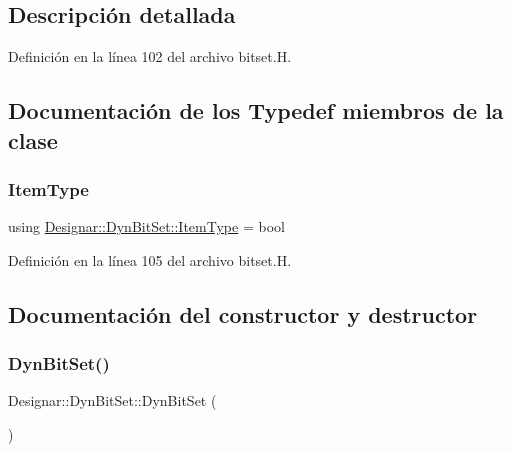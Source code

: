 \subsection{Descripción detallada}


Definición en la línea 102 del archivo bitset.\+H.



\subsection{Documentación de los \textquotesingle{}Typedef\textquotesingle{} miembros de la clase}
\mbox{\label{class_designar_1_1_dyn_bit_set_ad3f66987966a4fc27fec6d6ab552a1c7}} 
\subsubsection{\texorpdfstring{Item\+Type}{ItemType}}
{\footnotesize\ttfamily using \hyperlink{class_designar_1_1_dyn_bit_set_ad3f66987966a4fc27fec6d6ab552a1c7}{Designar\+::\+Dyn\+Bit\+Set\+::\+Item\+Type} =  bool}



Definición en la línea 105 del archivo bitset.\+H.



\subsection{Documentación del constructor y destructor}
\mbox{\label{class_designar_1_1_dyn_bit_set_a41e552380bd305a4069900b1e6b655e8}} 
\subsubsection{\texorpdfstring{Dyn\+Bit\+Set()}{DynBitSet()}\hspace{0.1cm}{\footnotesize\ttfamily [1/5]}}
{\footnotesize\ttfamily Designar\+::\+Dyn\+Bit\+Set\+::\+Dyn\+Bit\+Set (\begin{DoxyParamCaption}{ }\end{DoxyParamCaption})}



